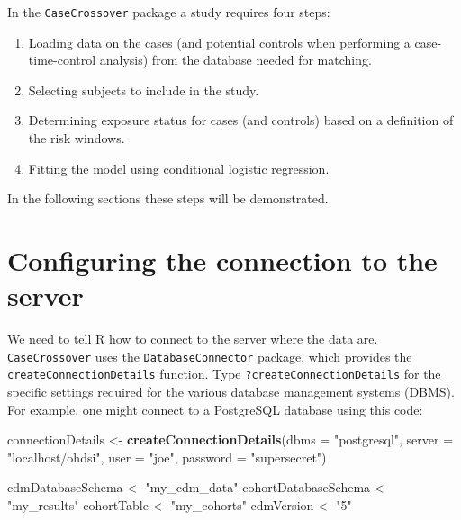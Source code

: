\documentclass[]{article}
\newenvironment{Shaded}{\begin{snugshade}}{\end{snugshade}}
\newcommand{\DataTypeTok}[1]{\textcolor[rgb]{0.13,0.29,0.53}{#1}}
\newcommand{\KeywordTok}[1]{\textcolor[rgb]{0.13,0.29,0.53}{\textbf{#1}}}
\newcommand{\NormalTok}[1]{#1}
\newcommand{\StringTok}[1]{\textcolor[rgb]{0.31,0.60,0.02}{#1}}
\providecommand{\tightlist}{%
  \setlength{\itemsep}{0pt}\setlength{\parskip}{0pt}}
\begin{document}
In the \texttt{CaseCrossover} package a study requires four steps:

\begin{enumerate}
\def\labelenumi{\arabic{enumi}.}
\tightlist
\item
  Loading data on the cases (and potential controls when performing a
  case-time-control analysis) from the database needed for matching.
\item
  Selecting subjects to include in the study.
\item
  Determining exposure status for cases (and controls) based on a
  definition of the risk windows.
\item
  Fitting the model using conditional logistic regression.
\end{enumerate}

In the following sections these steps will be demonstrated.

\hypertarget{configuring-the-connection-to-the-server}{%
\section{Configuring the connection to the
server}\label{configuring-the-connection-to-the-server}}

We need to tell R how to connect to the server where the data are.
\texttt{CaseCrossover} uses the \texttt{DatabaseConnector} package,
which provides the \texttt{createConnectionDetails} function. Type
\texttt{?createConnectionDetails} for the specific settings required for
the various database management systems (DBMS). For example, one might
connect to a PostgreSQL database using this code:

\begin{Shaded}
\begin{Highlighting}[]
\NormalTok{connectionDetails <-}\StringTok{ }\KeywordTok{createConnectionDetails}\NormalTok{(}\DataTypeTok{dbms =} \StringTok{"postgresql"}\NormalTok{, }
                                             \DataTypeTok{server =} \StringTok{"localhost/ohdsi"}\NormalTok{, }
                                             \DataTypeTok{user =} \StringTok{"joe"}\NormalTok{, }
                                             \DataTypeTok{password =} \StringTok{"supersecret"}\NormalTok{)}

\NormalTok{cdmDatabaseSchema <-}\StringTok{ "my_cdm_data"}
\NormalTok{cohortDatabaseSchema <-}\StringTok{ "my_results"}
\NormalTok{cohortTable <-}\StringTok{ "my_cohorts"}
\NormalTok{cdmVersion <-}\StringTok{ "5"}
\end{Highlighting}
\end{Shaded}
\end{document}
